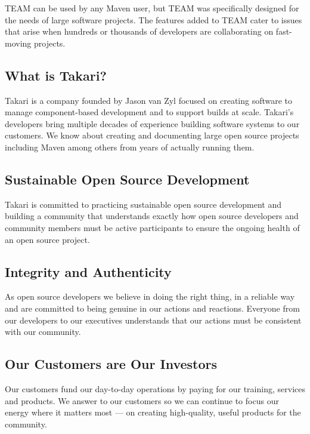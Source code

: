 \documentclass[a4paper]{book}
\begin{document}
TEAM can be used by any Maven user, but TEAM was specifically designed for the needs of large software projects. The features added to TEAM cater to issues that arise when hundreds or thousands of developers are collaborating on fast-moving projects.

\subsection{What is Takari?}\label{what-is-takari}

Takari is a company founded by Jason van Zyl focused on creating software to manage component-based development and to support builds at scale. Takari's developers bring multiple decades of experience building software systems to our customers. We know about creating and documenting large open source projects including Maven among others from years of actually running them.

\subsection{Sustainable Open Source Development}\label{sustainable-open-source-development}

Takari is committed to practicing sustainable open source development and building a community that understands exactly how open source developers and community members must be active participants to ensure the ongoing health of an open source project.

\subsection{Integrity and Authenticity}\label{integrity-and-authenticity}

As open source developers we believe in doing the right thing, in a reliable way and are committed to being genuine in our actions and reactions. Everyone from our developers to our executives understands that our actions must be consistent with our community.

\subsection{Our Customers are Our Investors}\label{our-customers-are-our-investors}

Our customers fund our day-to-day operations by paying for our training, services and products. We answer to our customers so we can continue to focus our energy where it matters most --- on creating high-quality, useful products for the community.
\end{document}
